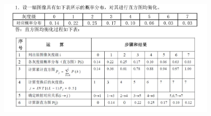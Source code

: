 \documentclass{article}
\begin{document}
\begin{CJK}{UTF8}{gbsn}
\centering
\includegraphics[width=0.8\textwidth,height=0.5\textwidth]{p3_key.jpg}

\end{CJK}
\end{document}
